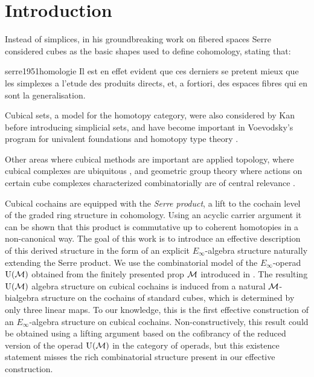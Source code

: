 
\section{Introduction} \label{s:introduction}

Instead of simplices, in his groundbreaking work on fibered spaces Serre considered cubes as the basic shapes used to define cohomology, stating that:

\begin{displaycquote}[p.431]{serre1951homologie}
	Il est en effet evident que ces derniers se pretent mieux que les simplexes a l'etude des produits directs, et, a fortiori, des espaces fibres qui en sont la generalisation.
\end{displaycquote}

Cubical sets, a model for the homotopy category, were also considered by Kan \cite{kan1955abstract, kan1956abstract} before introducing simplicial sets, and have become important in Voevodsky's program for univalent foundations and homotopy type theory \cite{kapulkin2020straightening, mortberg2017cubical}.

Other areas where cubical methods are important are applied topology, where cubical complexes are ubiquitous \cite{tomasz2004computational}, and geometric group theory where actions on certain cube complexes characterized combinatorially are of central relevance \cite{gromov1987hyperbolic, agol2013haken}.

Cubical cochains are equipped with the \textit{Serre product}, a lift to the cochain level of the graded ring structure in cohomology.
Using an acyclic carrier argument it can be shown that this product is commutative up to coherent homotopies in a non-canonical way.
The goal of this work is to introduce an effective description of this derived structure in the form of an explicit $E_\infty$-algebra structure naturally extending the Serre product.
We use the combinatorial model of the $E_\infty$-operad ${\operatorname{U}(\mathcal{M})}$ obtained from the finitely presented prop $\mathcal{M}$ introduced in \cite{medina2020prop1}.
The resulting ${\operatorname{U}(\mathcal{M})}$ algebra structure on cubical cochains is induced from a natural $\mathcal{M}$-bialgebra structure on the cochains of standard cubes, which is determined by only three linear maps.
To our knowledge, this is the first effective construction of an $E_\infty$-algebra structure on cubical cochains.
Non-constructively, this result could be obtained using a lifting argument based on the cofibrancy of the reduced version of the operad ${\operatorname{U}(\mathcal{M})}$ in the category of operads, but this existence statement misses the rich combinatorial structure present in our effective construction.

